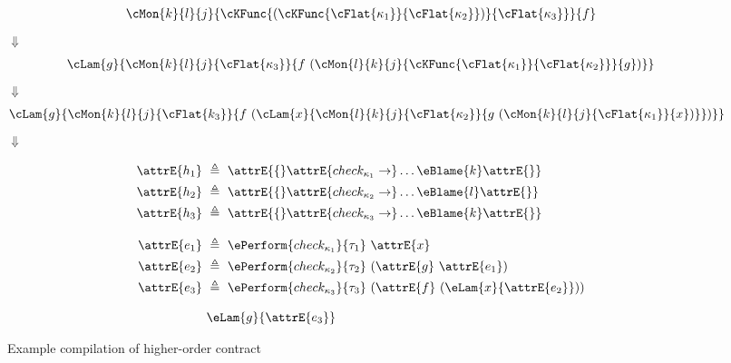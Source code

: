 \begin{figure}
\begin{align*}
  \cMon{k}{l}{j}{\cKFunc{(\cKFunc{\cFlat{\kappa_1}}{\cFlat{\kappa_2}})}{\cFlat{\kappa_3}}}{f}
\end{align*}
$\Downarrow$
\begin{align*}
  \cLam{g}{\cMon{k}{l}{j}{\cFlat{\kappa_3}}{f \ (\cMon{l}{k}{j}{\cKFunc{\cFlat{\kappa_1}}{\cFlat{\kappa_2}}}{g})}}
\end{align*}
$\Downarrow$
\begin{align*}
  \cLam{g}{\cMon{k}{l}{j}{\cFlat{k_3}}{f \ (\cLam{x}{\cMon{l}{k}{j}{\cFlat{\kappa_2}}{g \ (\cMon{k}{l}{j}{\cFlat{\kappa_1}}{x})}})}}
\end{align*}
$\Downarrow$

\begin{align*}
  \attrE{h_1} \ &\triangleq \ \attrE{\{} \attrE{check_{\kappa_1} \to} \dots \eBlame{k} \attrE{\}} \\
  \attrE{h_2} \ &\triangleq \ \attrE{\{} \attrE{check_{\kappa_2} \to} \dots \eBlame{l} \attrE{\}} \\
  \attrE{h_3} \ &\triangleq \ \attrE{\{} \attrE{check_{\kappa_3} \to} \dots \eBlame{k} \attrE{\}} \\[2ex]
  \attrE{e_1} \ &\triangleq \ {\ePerform{check_{\kappa_1}}{\tau_1} \ \attrE{x}} \\
  \attrE{e_2} \ &\triangleq \ {\ePerform{check_{\kappa_2}}{\tau_2} \ (\attrE{g} \ \attrE{e_1})} \\
  \attrE{e_3} \ &\triangleq \ {\ePerform{check_{\kappa_3}}{\tau_3} \ (\attrE{f} \ (\eLam{x}{\attrE{e_2}}))} \\[2ex]
  &\eLam{g}{\attrE{e_3}}
\end{align*}

\caption{Example compilation of higher-order contract}
\label{fig:example-compile-function}
\end{figure}

